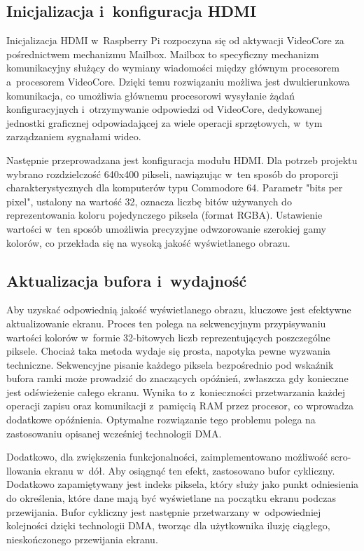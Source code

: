 \documentclass[shortabstract]{iithesis}
\begin{document}
\subsection{Inicjalizacja i~konfiguracja HDMI}
Inicjalizacja HDMI w~Raspberry Pi rozpoczyna się od aktywacji VideoCore za pośrednictwem mechanizmu Mailbox. Mailbox to specyficzny mechanizm komunikacyjny służący do wymiany wiadomości między głównym procesorem a~procesorem VideoCore. Dzięki temu rozwiązaniu możliwa jest dwukierunkowa komunikacja, co umożliwia głównemu procesorowi wysyłanie żądań konfiguracyjnych i~otrzymywanie odpowiedzi od VideoCore, dedykowanej jednostki graficznej odpowiadającej za wiele operacji sprzętowych, w~tym zarządzaniem sygnałami wideo.

Następnie przeprowadzana jest konfiguracja modułu HDMI. Dla potrzeb projektu wybrano rozdzielczość 640x400 pikseli, nawiązując w~ten sposób do proporcji charakterystycznych dla komputerów typu Commodore 64. Parametr "bits per pixel", ustalony na wartość 32, oznacza liczbę bitów używanych do reprezentowania koloru pojedynczego piksela (format RGBA). Ustawienie wartości w~ten sposób umożliwia precyzyjne odwzorowanie szerokiej gamy kolorów, co przekłada się na wysoką jakość wyświetlanego obrazu.
\subsection{Aktualizacja bufora i~wydajność}
Aby uzyskać odpowiednią jakość wyświetlanego obrazu, kluczowe jest efektywne aktualizowanie ekranu. Proces ten polega na sekwencyjnym przypisywaniu wartości kolorów w~formie 32-bitowych liczb reprezentujących poszczególne piksele. Chociaż taka metoda wydaje się prosta, napotyka pewne wyzwania techniczne. Sekwencyjne pisanie każdego piksela bezpośrednio pod wskaźnik bufora ramki może prowadzić do znaczących opóźnień, zwłaszcza gdy konieczne jest odświeżenie całego ekranu. Wynika to z~konieczności przetwarzania każdej operacji zapisu oraz komunikacji z~pamięcią RAM przez procesor, co wprowadza dodatkowe opóźnienia. Optymalne rozwiązanie tego problemu polega na zastosowaniu opisanej wcześniej technologii DMA.

Dodatkowo, dla zwiększenia funkcjonalności, zaimplementowano możliwość scro-llowania ekranu w~dół. Aby osiągnąć ten efekt, zastosowano bufor cykliczny. Dodatkowo zapamiętywany jest indeks piksela, który służy jako punkt odniesienia do określenia, które dane mają być wyświetlane na początku ekranu podczas przewijania. Bufor cykliczny jest następnie przetwarzany w~odpowiedniej kolejności dzięki technologii DMA, tworząc dla użytkownika iluzję ciągłego, nieskończonego przewijania ekranu.
\end{document}
